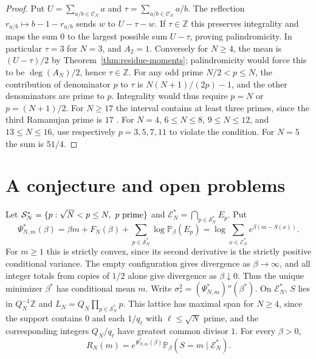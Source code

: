 \documentclass[11pt]{amsart}
\theoremstyle{remark}
\newcommand{\Pp}{\mathbb P}
\newcommand{\Z}{\mathbb Z}
\newcommand{\CN}{\mathcal C_N}
\begin{document}
\begin{proof}
Put \(U=\sum_{a/b\in\CN} a\) and \(\tau=\sum_{a/b\in\CN}a/b\).
The reflection \(r_{a/b}\mapsto b-1-r_{a/b}\) sends \(w\) to
\(U-\tau-w\). If \(\tau\in\Z\) this preserves integrality and maps
the sum \(0\) to the largest possible sum \(U-\tau\), proving
palindromicity. In particular \(\tau=3\) for \(N=3\), and \(A_2=1\).
Conversely for \(N\ge4\), the mean is \((U-\tau)/2\) by
Theorem~\ref{thm:residue-moments}; palindromicity would force
this to be \(\deg(A_N)/2\), hence \(\tau\in\Z\).
For any odd prime \(N/2<p\le N\), the contribution of denominator
\(p\) to \(\tau\) is \(N(N+1)/(2p)-1\), and the other denominators
are prime to \(p\). Integrality would thus require \(p=N\) or
\(p=(N+1)/2\). For \(N\ge17\) the interval contains at least three
primes, since the third Ramanujan prime is \(17\) \cite{sondow}.
For \(N=4\), \(6\le N\le8\), \(9\le N\le12\), and \(13\le N\le16\),
use respectively \(p=3,5,7,11\) to violate the condition.
For \(N=5\) the sum is \(51/4\).
\end{proof}

\section{A conjecture and open problems}\label{sec:conjecture}

Let \(\mathcal S_N^\ast=\{p:\sqrt N<p\le N,\ p\ {\rm prime}\}\) and
\(\mathcal E_N^\ast=\bigcap_{p\in\mathcal S_N^\ast}E_p\). Put
\[
 \Psi_{N,m}^\ast(\beta)
 =\beta m+F_N(\beta)+\sum_{p\in\mathcal S_N^\ast}\log\Pp_\beta(E_p)
 =\log\sum_{x\in\mathcal E_N^\ast}e^{\beta(m-S(x))}.
\]
For \(m\ge1\) this is strictly convex, since its second derivative
is the strictly positive conditional variance. The empty configuration
gives divergence as \(\beta\to\infty\), and all integer totals from
copies of \(1/2\) alone give divergence as \(\beta\downarrow0\).
Thus the unique minimizer \(\beta^\ast\) has conditional mean \(m\).
Write \(\sigma_\ast^2=(\Psi_{N,m}^\ast)''(\beta^\ast)\).
On \(\mathcal E_N^\ast\), \(S\) lies in \(Q_N^{-1}\Z\) and
\(L_N=Q_N\prod_{p\in\mathcal S_N^\ast}p\).
This lattice has maximal span for \(N\ge4\), since the support
contains \(0\) and each \(1/q_\ell\) with \(\ell\le\sqrt N\) prime,
and the corresponding integers \(Q_N/q_\ell\) have greatest common
divisor \(1\). For every \(\beta>0\),
\begin{equation}\label{eq:local-limit-identity}
 R_N(m)=e^{\Psi_{N,m}^\ast(\beta)}
             \Pp_\beta(S=m\mid\mathcal E_N^\ast).
\end{equation}
\end{document}
